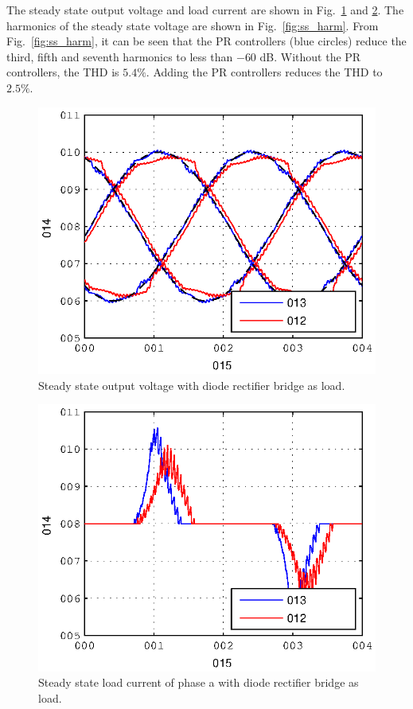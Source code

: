 \documentclass[conference,10pt]{IEEEtran}
\begin{document}
The steady state output voltage and load current are shown in Fig.~\ref{fig:ss_vc} and \ref{fig:ss_iload}. The harmonics of the steady state voltage are shown in Fig.~\ref{fig:ss_harm}. From Fig.~\ref{fig:ss_harm}, it can be seen that the PR controllers (blue circles) reduce the third, fifth and seventh harmonics to less than $-60$ dB.
Without the PR controllers, the THD is $5.4 \%$. Adding the PR controllers reduces the THD to $2.5 \%$.
\begin{figure}[!h]
\centering

\includegraphics{fig/steady_state_vCf}
\caption{Steady state output voltage with diode rectifier bridge as load.}
\label{fig:ss_vc}
\end{figure}
\begin{figure}[!h]
\centering

\includegraphics{fig/steady_state_iLoad}
\caption{Steady state load current of phase a with diode rectifier bridge as load.}
\label{fig:ss_iload}
\end{figure}
\end{document}
